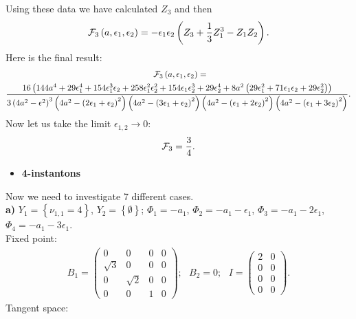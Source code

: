 \documentclass[a4paper,12pt]{article}
\begin{document}
Using these data we have calculated $Z_3$ and then
\[ {\cal F}_3\left(a, \epsilon_1,\epsilon_2\right)=-\epsilon_1 \epsilon_2 \left(Z_3 +
\frac{1}{3} Z_1^3 - Z_1 Z_2 \right). \]
Here is the final result:
\begin{eqnarray}
{\cal F}_3\left(a, \epsilon_1,\epsilon_2\right)= \hspace{6 cm} \\ \frac{16 \left(144 a^4 + 29 \epsilon_1^4 + 154
\epsilon_1^3 \epsilon_2 + 258 \epsilon_1^2 \epsilon_2^2 +154 \epsilon_1 \epsilon_2^3 + 29 \epsilon_2^4 + 8 a^2
\left(29 \epsilon_1^2 + 71 \epsilon_1 \epsilon_2 + 29 \epsilon_2^2 \right) \right)}{3\left(4a^2 - \epsilon^2
\right)^3 \left(4a^2 -\left( 2 \epsilon_1  + \epsilon_2\right)^2 \right) \left(4a^2 -\left( 3\epsilon_1
+\epsilon_2\right)^2 \right)\left( 4a^2 -\left( \epsilon_1 + 2\epsilon_2\right)^2 \right) \left(4a^2 -\left(
\epsilon_1 + 3\epsilon_2\right)^2 \right)}. \nonumber
\end{eqnarray}
Now let us take the limit $\epsilon_{1,2}\rightarrow 0$:
\[
{\cal F}_3=\frac{3}{4}.
\]
\begin{itemize}
\item {\bf 4-instantons}
\end{itemize}
Now we need to investigate 7 different cases.\\
{\bf a)} $Y_1=\left\{\nu_{1,1}=4\right\}$,
$Y_2=\left\{\emptyset\right\}$; $\Phi_1=-a_1$,
$\Phi_2=-a_1-\epsilon_1$,
$\Phi_3=-a_1-2\epsilon_1$, $\Phi_4=-a_1-3\epsilon_1$. \\
Fixed point:
\begin{eqnarray}
B_1=\left(\begin{array}{cccc} 0 & 0 & 0 & 0 \\ \sqrt{3} & 0 & 0 & 0 \\ 0 & \sqrt{2} & 0 & 0 \\
0 & 0 & 1 & 0
\end{array}\right); \, \, \, \,
B_2=0; \, \, \, \, I=\left(\begin{array}{cc} 2 & 0 \\ 0 & 0 \\0 & 0 \\ 0 & 0
\end{array}\right).
\end{eqnarray}
Tangent space:
\end{document}
